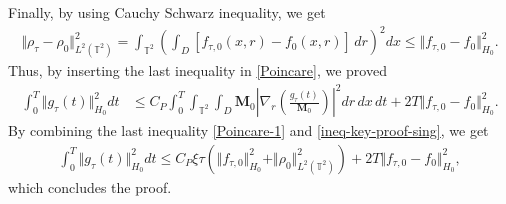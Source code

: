 \documentclass[a4paper,12pt, reqno]{amsart}
\newenvironment{acknowledgements}{%
  \renewcommand{\abstractname}{Acknowledgements}%
  \begin{abstract}
}{%
  \end{abstract}
}
\begin{document}
Finally, by using Cauchy Schwarz inequality, we get
\begin{align*}
    \Vert \rho_\tau-\rho_0 \Vert^2_{L^2(\mathbb T^2)}=\int_{\mathbb T^2}
\left(\int_D [f_{\tau,0}(x,r)-f_0(x,r)]\,dr
\right)^2
dx\leq  \Vert f_{\tau,0}-f_0\Vert_{H_0}^2.
\end{align*}
Thus, by inserting the last inequality in \eqref{Poincare}, we proved
  \begin{align}\label{Poincare-1}
\int_0^T  \Vert g_{\tau}(t)\Vert_{H_0}^2 dt
&\le C_P
\int_0^T \int_{\mathbb T^2} \int_D
\mathbf M_0
\left|
\nabla_r \!\left(
\frac{g_\tau(t)}{\mathbf M_0}
\right)
\right|^2
dr\,dx\,dt 
+2T\Vert f_{\tau,0}-f_0\Vert_{H_0}^2.
       \end{align}
By combining the last inequality \eqref{Poincare-1} and \eqref{ineq-key-proof-sing}, we get 
         \begin{align}\label{ineq-key-proof-sing++}
 \int_0^T  \Vert g_{\tau}(t)\Vert_{H_0}^2 dt \leq C_P  \xi\tau (\Vert f_{\tau, 0}\Vert_{H_0}^2+\Vert \rho_0 \Vert^2_{L^2(\mathbb{T}^2)})+2T\Vert f_{\tau,0}-f_0\Vert_{H_0}^2,
          \end{align}
          which concludes the proof.
          
         \begin{acknowledgements}  The research of  Y.T. is
funded by the European Union (ERC, NoisyFluid, No. 101053472). Views and opinions expressed are however those of the author only and do not necessarily reflect those of the European Union or the European Research Council. Neither the European Union nor the granting authority can be held responsible for them. The authors  would like to thank  Franco Flandoli for   valuable discussion. 
\end{acknowledgements}

\end{document}
